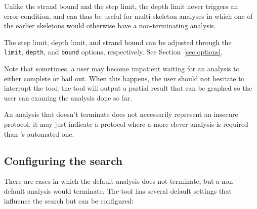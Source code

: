 Unlike the strand bound and the step limit, the depth limit never
triggers an error condition, and can thus be useful for multi-skeleton
analyses in which one of the earlier skeletons would otherwise have a
non-terminating analysis.

The step limit, depth limit, and strand bound can be adjusted through the
\texttt{limit}, \texttt{depth}, and \texttt{bound} options, respectively.  See
Section~\ref{sec:options}.

Note that sometimes, a user may become impatient waiting for an
analysis to either complete or bail out.  When this happens, the user should
not hesitate to interrupt the tool; the tool will output a partial result that can
be graphed so the user can examing the analysis done so far.

An analysis that doesn't terminate does not necessarily represent an
insecure protocol, it may just indicate a protocol where a more clever
analysis is required than {\cpsa}'s automated one.

\subsection{Configuring the search}
There are cases in which the default {\cpsa} analysis does not
terminate, but a non-default analysis would terminate.  The tool has
several default settings that influence the search but can be
configured:

